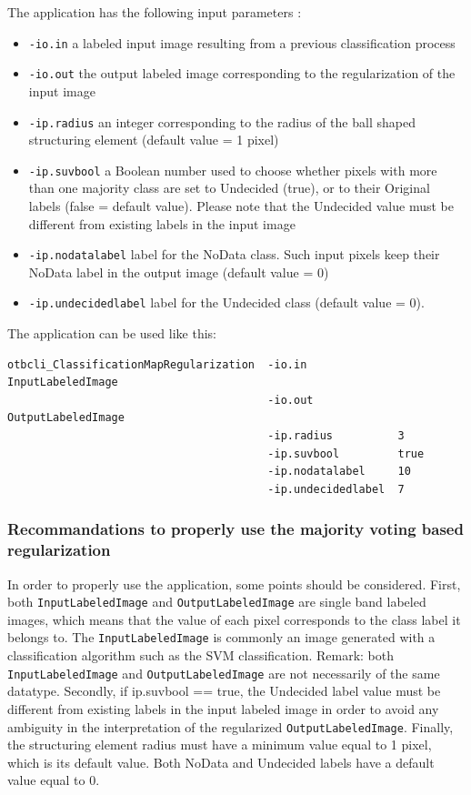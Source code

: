 The  application has the following input parameters :
\begin{itemize}
\item \verb?-io.in? a labeled input image resulting from a previous classification process
\item \verb?-io.out? the output labeled image corresponding to the regularization of the input image
\item \verb?-ip.radius? an integer corresponding to the radius of the ball shaped structuring element (default value = 1 pixel)
\item \verb?-ip.suvbool? a Boolean number used to choose whether pixels with more than one majority class are set to Undecided (true),
or to their Original labels (false = default value). Please note that the Undecided value must be different from existing labels in the input image
\item \verb?-ip.nodatalabel? label for the NoData class. Such input pixels keep their NoData label in the output image (default value = 0)
\item \verb?-ip.undecidedlabel? label for the Undecided class (default value = 0).
\end{itemize}


The application can be used like this:
\begin{verbatim}
otbcli_ClassificationMapRegularization  -io.in              InputLabeledImage
                                        -io.out             OutputLabeledImage
                                        -ip.radius          3
                                        -ip.suvbool         true
                                        -ip.nodatalabel     10
                                        -ip.undecidedlabel  7
\end{verbatim}
 

\subsubsection{Recommandations to properly use the majority voting based regularization}

In order to properly use the  application, some points should be considered.
First, both \verb?InputLabeledImage? and \verb?OutputLabeledImage? are single band labeled images, which means that the
value of each pixel corresponds to the class label it belongs to. The \verb?InputLabeledImage? is commonly an image generated
with a classification algorithm such as the SVM classification. Remark: both
\verb?InputLabeledImage? and \verb?OutputLabeledImage? are not necessarily of the same datatype. Secondly, if ip.suvbool == true,
the Undecided label value must be different from existing labels in the input labeled image in order to avoid any ambiguity in the
interpretation of the regularized \verb?OutputLabeledImage?. Finally, the structuring element radius must have a minimum value equal to 1 pixel,
which is its default value. Both NoData and Undecided labels have a default value equal to 0.


